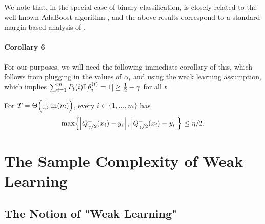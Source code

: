 We note that, in the special case of binary classification, 
is closely related to the well-known AdaBoost algorithm
\citep{FreundSchapire97}, 
and the above results correspond to a
standard
margin-based analysis of
\citet{MR1673273}.

    


\paragraph{Corollary 6} %

For our purposes, we will need the following immediate corollary of this, 
which follows from plugging in the values of $\alpha_{t}$ and using the weak learning assumption, 
which implies $\sum_{i=1}^{m} P_{t}(i) \mathbb{I}[ \theta_{i}^{(t)} = 1 ] \geq \frac{1}{2} + \gamma$ for all $t$.

\begin{corollary}
\label{cor:kegl-T-size}
For $T = \Theta\!\left(\frac{1}{\gamma^{2}} \ln(m)\right)$, 
every $i \in \{1,\ldots,m\}$ has 
\begin{equation*}
\max\!\left\{ \left| Q_{\gamma/2}^{+}(x_{i}) - y_{i} \right|, \left| Q_{\gamma/2}^{-}(x_{i}) - y_{i} \right| \right\} \leq \eta/2.
\end{equation*}
\end{corollary}


    


\section{The Sample Complexity of Weak Learning}

\blindmathpaper

    


\subsection{The Notion of "Weak Learning"}

\blindmathpaper

